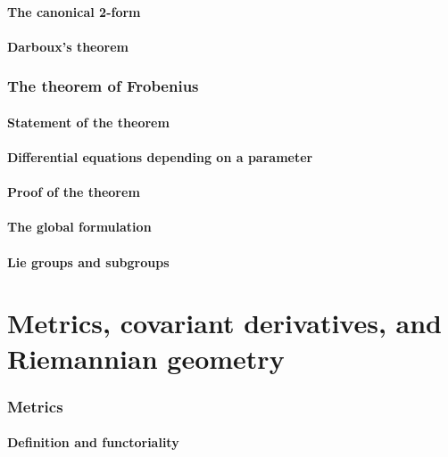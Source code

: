 \documentclass[a4paper]{article}
\begin{document}
\subsection{The canonical 2-form}

\subsection{Darboux's theorem}

\section{The theorem of Frobenius}

\subsection{Statement of the theorem}

\subsection{Differential equations depending on a parameter}

\subsection{Proof of the theorem}

\subsection{The global formulation}

\subsection{Lie groups and subgroups}

\part{Metrics, covariant derivatives, and Riemannian geometry}

\section{Metrics}

\subsection{Definition and functoriality}
\end{document}
